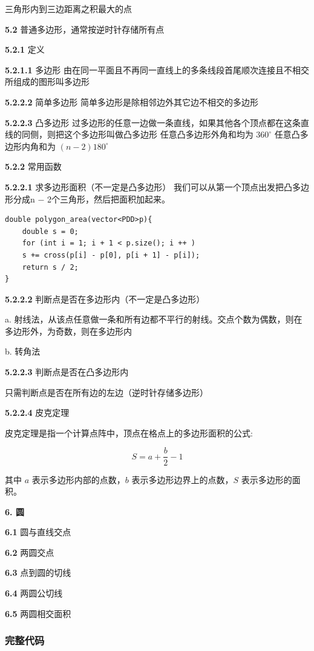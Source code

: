 \documentclass[12pt]{article}
\begin{document}
三角形内到三边距离之积最大的点

\textbf{5.2} 普通多边形，通常按逆时针存储所有点

\textbf{5.2.1} 定义

\textbf{5.2.1.1} 多边形
由在同一平面且不再同一直线上的多条线段首尾顺次连接且不相交所组成的图形叫多边形

\textbf{5.2.2.2} 简单多边形
简单多边形是除相邻边外其它边不相交的多边形

\textbf{5.2.2.3} 凸多边形
过多边形的任意一边做一条直线，如果其他各个顶点都在这条直线的同侧，则把这个多边形叫做凸多边形
任意凸多边形外角和均为 $360^{\circ}$
任意凸多边形内角和为 $(n−2)180^{\circ}$

\textbf{5.2.2} 常用函数

\textbf{5.2.2.1} 求多边形面积（不一定是凸多边形）
我们可以从第一个顶点出发把凸多边形分成n − 2个三角形，然后把面积加起来。

\begin{lstlisting}[style=C++]
double polygon_area(vector<PDD>p){
	double s = 0;
	for (int i = 1; i + 1 < p.size(); i ++ )
	s += cross(p[i] - p[0], p[i + 1] - p[i]);
	return s / 2;
}
\end{lstlisting}

\textbf{5.2.2.2} 判断点是否在多边形内（不一定是凸多边形）
      
a. 射线法，从该点任意做一条和所有边都不平行的射线。交点个数为偶数，则在多边形外，为奇数，则在多边形内

b. 转角法

\textbf{5.2.2.3} 判断点是否在凸多边形内

只需判断点是否在所有边的左边（逆时针存储多边形）

\textbf{5.2.2.4} 皮克定理

皮克定理是指一个计算点阵中，顶点在格点上的多边形面积的公式:

$$
S = a + \frac{b}{2} - 1
$$

其中 $a$ 表示多边形内部的点数，$b$ 表示多边形边界上的点数，$S$ 表示多边形的面积。

\textbf{6. 圆}

\textbf{6.1} 圆与直线交点

\textbf{6.2} 两圆交点

\textbf{6.3} 点到圆的切线

\textbf{6.4} 两圆公切线

\textbf{6.5} 两圆相交面积

\newpage

\subsubsection{完整代码}
\end{document}
